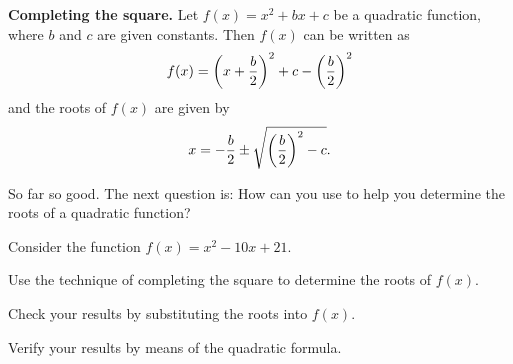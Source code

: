 \documentclass[a4paper,oneside,12pt]{article}
\begin{document}
\begin{theorem}
\label{thm:quadroots:monic_quadratic_roots}
\textbf{Completing the square.}
Let $f(x) = x^2 + bx + c$ be a quadratic function, where $b$ and $c$
are given constants.  Then $f(x)$ can be written as
\[
f(x)
=
\parenthesis*{x + \frac{b}{2}}^2
+
c
-
\parenthesis*{\frac{b}{2}}^2
\]
and the roots of $f(x)$ are given by
\[
x
=
-\frac{b}{2}
\pm
\sqrt{
  \parenthesis*{\frac{b}{2}}^2 - c
}.
\]
\end{theorem}

So far so good.  The next question is: How can you use
 to help you determine
the roots of a quadratic function?

\begin{example}
\label{eg:quadroots:completing_square_monic_bminus10_c21}
Consider the function $f(x) = x^2 - 10x + 21$.
\begin{packedenum}
\item\label{subeg:quadroots:completing_square_roots_a1_bminus10_c21}
  Use the technique of completing the square to determine the roots of
  $f(x)$.

\item\label{subeg:quadroots:completing_square_verify_substitution_a1_bminus10_c21}
  Check your results by substituting the roots into $f(x)$.

\item\label{subeg:quadroots:completing_square_verify_quadform_a1_bminus10_c21}
  Verify your results by means of the quadratic formula.
\end{packedenum}
\end{example}
\end{document}
